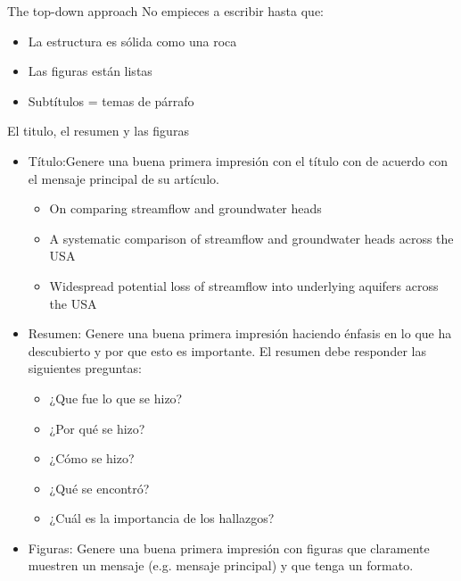 \documentclass[
10pt,
aspectratio=169,
]{beamer}
\begin{document}
\begin{frame}{The top-down approach}
No empieces a escribir hasta que:
\begin{itemize}
\item La estructura es sólida como una roca
\item Las figuras están listas
\item Subtítulos = temas de párrafo
\end{itemize}
\end{frame}

\begin{frame}{El titulo, el resumen y las figuras}
\begin{itemize}
\item \alert{T\'itulo}:Genere una buena primera impresi\'on con el t\'itulo con de acuerdo con el mensaje principal de su art\'iculo.
\begin{itemize}
\item \alert{On comparing streamflow and groundwater heads}
\item \alert{A systematic comparison of streamflow and groundwater heads across the USA}
\item {\color{blue}Widespread potential  loss  of streamflow into underlying aquifers across the USA}
\end{itemize}
\item \alert{Resumen}: Genere una buena primera impresi\'on haciendo énfasis en lo que ha descubierto y por que esto es importante. El resumen debe responder las siguientes preguntas:
\begin{itemize}
\item ¿Que fue lo que se hizo?
\item ¿Por qué se hizo?
\item ¿Cómo se hizo?
\item ¿Qué se encontró?
\item ¿Cuál es la importancia de los hallazgos?
\end{itemize}
\item \alert{Figuras}: Genere una buena primera impresi\'on con figuras que claramente muestren un mensaje (e.g. mensaje principal) y que tenga un formato. 
\end{itemize}
\end{frame}
\end{document}
